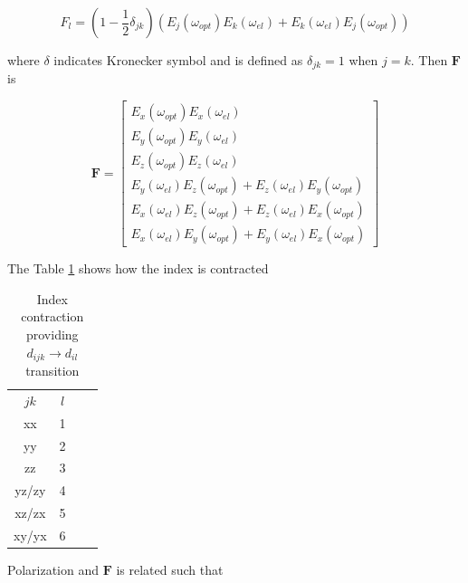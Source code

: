 \documentclass[thesis]{deutez}
\begin{document}
    \begin{equation}
        F_l = (1-\frac{1}{2}\delta_{jk})(E_j(\omega_{opt})E_k(\omega_{el})+E_k(\omega_{el})E_j(\omega_{opt}))
        \label{eq:F}
    \end{equation}

    where $\delta$ indicates Kronecker symbol and is defined as $\delta_{jk}=1$ when $j=k$. Then $\mathbf{F}$ is 

    \begin{equation}
    \mathbf{F=}
    \begin{bmatrix}
        E_x(\omega_{opt})E_x(\omega_{el}) \\
        E_y(\omega_{opt})E_y(\omega_{el}) \\
        E_z(\omega_{opt})E_z(\omega_{el}) \\
        E_y(\omega_{el})E_z(\omega_{opt})+E_z(\omega_{el})E_y(\omega_{opt}) \\
        E_x(\omega_{el})E_z(\omega_{opt})+E_z(\omega_{el})E_x(\omega_{opt}) \\
        E_x(\omega_{el})E_y(\omega_{opt})+E_y(\omega_{el})E_x(\omega_{opt})
    \end{bmatrix}
    \label{eq:F_matrix}
    \end{equation}

    
    
    The Table \ref{tab:index-contraction} shows how the index is contracted

    \begin{table}[h]
        \centering
        \begin{tabular}{|c|c|c|c}
            \cline{1-2}
            $jk$ & $l$ \\ \cline{1-2}
            xx   & 1       \\ \cline{1-2}
            yy   & 2     \\ \cline{1-2}
            zz   & 3    \\ \cline{1-2}
            yz/zy   & 4    \\ \cline{1-2}
            xz/zx   & 5    \\ \cline{1-2}
            xy/yx   & 6    \\ \cline{1-2}
        \end{tabular}
        \caption{Index contraction providing $d_{ijk} \rightarrow d_{il}$ transition}
        \label{tab:index-contraction}
    \end{table}

    Polarization and $\mathbf{F} $ is related such that
\end{document}

